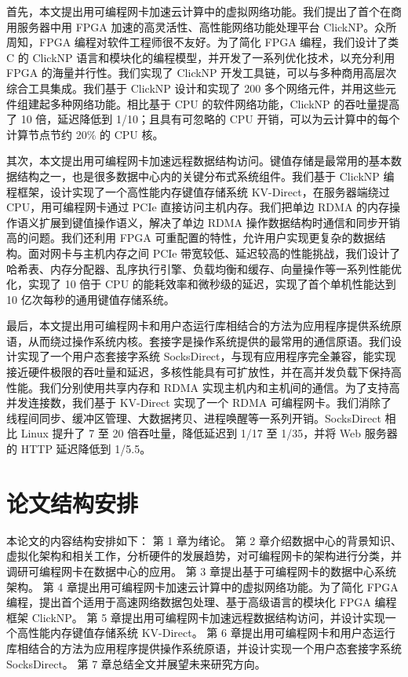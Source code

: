 首先，本文提出用可编程网卡加速云计算中的虚拟网络功能。我们提出了首个在商用服务器中用 FPGA 加速的高灵活性、高性能网络功能处理平台 ClickNP。众所周知，FPGA 编程对软件工程师很不友好。为了简化 FPGA 编程，我们设计了类 C 的 ClickNP 语言和模块化的编程模型，并开发了一系列优化技术，以充分利用 FPGA 的海量并行性。我们实现了 ClickNP 开发工具链，可以与多种商用高层次综合工具集成。我们基于 ClickNP 设计和实现了 200 多个网络元件，并用这些元件组建起多种网络功能。相比基于 CPU 的软件网络功能，ClickNP 的吞吐量提高了 10 倍，延迟降低到 1/10；且具有可忽略的 CPU 开销，可以为云计算中的每个计算节点节约 20\% 的 CPU 核。

其次，本文提出用可编程网卡加速远程数据结构访问。键值存储是最常用的基本数据结构之一，也是很多数据中心内的关键分布式系统组件。我们基于 ClickNP 编程框架，设计实现了一个高性能内存键值存储系统 KV-Direct，在服务器端绕过 CPU，用可编程网卡通过 PCIe 直接访问主机内存。我们把单边 RDMA 的内存操作语义扩展到键值操作语义，解决了单边 RDMA 操作数据结构时通信和同步开销高的问题。我们还利用 FPGA 可重配置的特性，允许用户实现更复杂的数据结构。面对网卡与主机内存之间 PCIe 带宽较低、延迟较高的性能挑战，我们设计了哈希表、内存分配器、乱序执行引擎、负载均衡和缓存、向量操作等一系列性能优化，实现了 10 倍于 CPU 的能耗效率和微秒级的延迟，实现了首个单机性能达到 10 亿次每秒的通用键值存储系统。

最后，本文提出用可编程网卡和用户态运行库相结合的方法为应用程序提供系统原语，从而绕过操作系统内核。套接字是操作系统提供的最常用的通信原语。我们设计实现了一个用户态套接字系统 SocksDirect，与现有应用程序完全兼容，能实现接近硬件极限的吞吐量和延迟，多核性能具有可扩放性，并在高并发负载下保持高性能。我们分别使用共享内存和 RDMA 实现主机内和主机间的通信。为了支持高并发连接数，我们基于 KV-Direct 实现了一个 RDMA 可编程网卡。我们消除了线程间同步、缓冲区管理、大数据拷贝、进程唤醒等一系列开销。SocksDirect 相比 Linux 提升了 7 至 20 倍吞吐量，降低延迟到 1/17 至 1/35，并将 Web 服务器的 HTTP 延迟降低到 1/5.5。


\section{论文结构安排}

本论文的内容结构安排如下：
第 1 章为绪论。
第 2 章介绍数据中心的背景知识、虚拟化架构和相关工作，分析硬件的发展趋势，对可编程网卡的架构进行分类，并调研可编程网卡在数据中心的应用。
第 3 章提出基于可编程网卡的数据中心系统架构。
第 4 章提出用可编程网卡加速云计算中的虚拟网络功能。为了简化 FPGA 编程，提出首个适用于高速网络数据包处理、基于高级语言的模块化 FPGA 编程框架 ClickNP。
第 5 章提出用可编程网卡加速远程数据结构访问，并设计实现一个高性能内存键值存储系统 KV-Direct。
第 6 章提出用可编程网卡和用户态运行库相结合的方法为应用程序提供操作系统原语，并设计实现一个用户态套接字系统 SocksDirect。
第 7 章总结全文并展望未来研究方向。